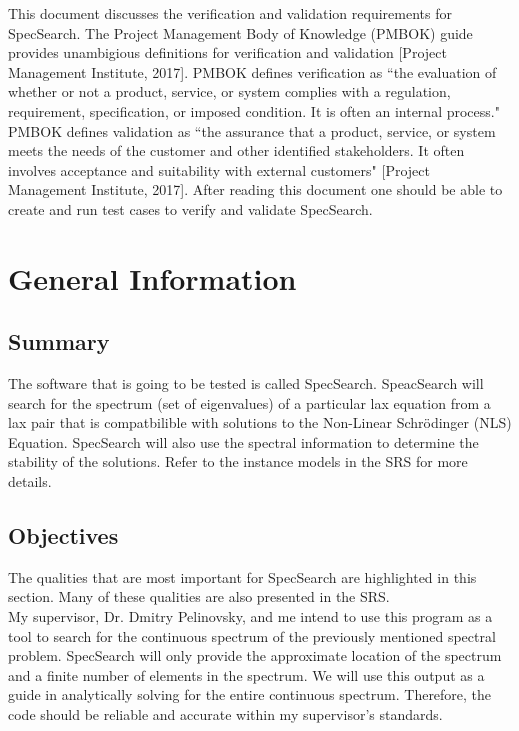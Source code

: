 \documentclass[12pt, titlepage]{article}
\begin{document}
\listoftables


\newpage


This document discusses the verification and validation requirements for 
SpecSearch. The Project Management Body of Knowledge (PMBOK) guide provides 
unambigious definitions for verification and validation [Project Management 
Institute, 2017]. PMBOK defines 
verification as ``the evaluation of whether or not a product, service, or 
system 
complies with a regulation, requirement, specification, or imposed condition. 
It is often an internal process." \\

PMBOK defines validation as ``the assurance that 
a product, service, or system meets the needs of the customer and other 
identified stakeholders. It often involves acceptance and suitability with 
external customers" [Project Management Institute, 2017]. After reading this 
document one should be able to create and run test cases to verify and validate 
SpecSearch. 

\section{General Information}

\subsection{Summary}
\label{Summary} 

The software that is going to be tested is called SpecSearch. SpeacSearch will 
search for the 
spectrum (set of eigenvalues) of a particular lax equation from a lax pair that 
is compatbilible 
with solutions to the Non-Linear Schr\"{o}dinger (NLS) Equation. SpecSearch 
will 
also use 
the spectral information to determine the stability of the solutions. Refer to 
the 
instance models in the SRS for more details.
\subsection{Objectives}
\label{Objectives}
	The qualities that are most important for SpecSearch are highlighted in 
	this section. Many of these qualities are also presented in the SRS. \\
	
	My supervisor, Dr. Dmitry Pelinovsky, and me intend to use this program as 
	a tool to search for the 
	continuous spectrum of the previously mentioned spectral problem. 
	SpecSearch 
	will only provide the approximate 
	location of the spectrum and a finite number of elements in the spectrum. 
	We will 
	use this output as a guide in analytically solving for the 
	entire continuous spectrum.  Therefore, the 
	code should be reliable and accurate within my supervisor's standards. \\
	
\end{document}
